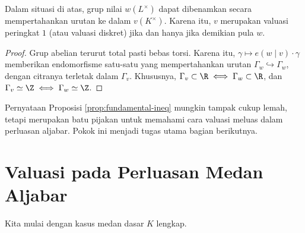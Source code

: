\begin{corollary}\label{prop:value-group-ext}
	Dalam situasi di atas, grup nilai $w(L^\times)$ dapat dibenamkan secara mempertahankan urutan ke dalam $v(K^\times)$. Karena itu, $v$ merupakan valuasi peringkat $1$ (atau valuasi diskret) jika dan hanya jika demikian pula $w$.
\end{corollary}
\begin{proof}
	Grup abelian terurut total pasti bebas torsi. Karena itu, $\gamma \mapsto e(w \mid v) \cdot \gamma$ memberikan endomorfisme satu-satu yang mempertahankan urutan $\Gamma_w \hookrightarrow \Gamma_w$, dengan citranya terletak dalam $\Gamma_v$. Khususnya, $\Gamma_v \subset \R \iff \Gamma_w \subset \R$, dan $\Gamma_v \simeq \Z \iff \Gamma_w \simeq \Z$.
\end{proof}

Pernyataan Proposisi \ref{prop:fundamental-ineq} mungkin tampak cukup lemah, tetapi merupakan batu pijakan untuk memahami cara valuasi meluas dalam perluasan aljabar. Pokok ini menjadi tugas utama bagian berikutnya.

\section{Valuasi pada Perluasan Medan Aljabar}\label{sec:valuation-ext-2}
Kita mulai dengan kasus medan dasar $K$ lengkap.

